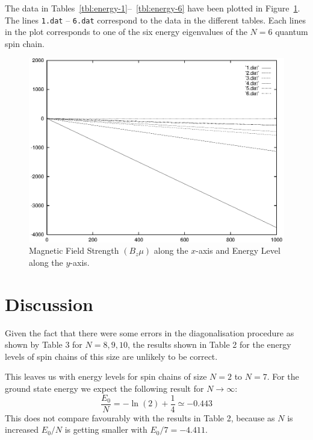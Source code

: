 \documentclass[a4paper]{IEEEtran}
\begin{document}
    The data in Tables~\ref{tbl:energy-1}--~\ref{tbl:energy-6}  
    have been plotted in Figure~\ref{fig:magnetic}. The lines
    \texttt{1.dat} -- \texttt{6.dat} correspond to the data in the different
    tables. Each lines in the plot corresponds to one of the six energy eigenvalues
    of the $N=6$ quantum spin chain.

    \begin{figure}[ht!]  
        \centering
        \caption{Magnetic Field Strength $(B_z\mu)$ along the $x$-axis
             and Energy Level along the $y$-axis.}
        \label{fig:magnetic} 
        \includegraphics[width=\columnwidth]{magnetic.eps}
    \end{figure} 

\section{Discussion}

    Given the fact that there were some errors in the diagonalisation procedure
    as shown by Table 3 for $N=8,9,10$, the results shown in Table 2 for
    the energy levels of spin chains of this size are unlikely to 
    be correct. 

    This leaves us with energy levels for spin chains of size $N=2$ to
    $N=7$. For the ground state energy we expect the following result
    for $N \rightarrow \infty$:
        \[ \frac{E_0}{N} = -\ln(2) + \frac{1}{4} \simeq -0.443 \]
    This does not compare favourably with the results in Table 2, because
    as $N$ is increased $E_0/N$ is getting smaller with $E_0/7 = -4.411$.
\end{document}
